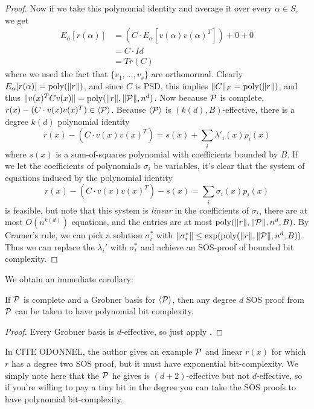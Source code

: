 \begin{proof}
Now if we take this polynomial identity and average it over every $\alpha \in S$, we get
\begin{align*}
E_\alpha[r(\alpha)] &= (C \cdot E_\alpha[v(\alpha)v(\alpha)^T]) + 0 + 0\\
&= C \cdot Id \\
&= Tr(C)
\end{align*}
where we used the fact that $\{v_1,\dots,v_s\}$ are orthonormal. Clearly $E_\alpha[r(\alpha)] = \operatorname{poly}(\|r\|)$, and since $C$ is PSD, this implies $\|C\|_F = \operatorname{poly}(\|r\|)$, and thus $\|v(x)^TCv(x)\| = \operatorname{poly}(\|r\|,\|\mathcal P\|,n^d)$. Now because $\mathcal P$ is complete, $r(x) - (C \cdot v(x)v(x)^T) \in \langle \mathcal P\rangle$. Because $\langle \mathcal P\rangle$ is $(k(d), B)$-effective, there is a degree $k(d)$ polynomial identity
\[r(x) - (C \cdot v(x)v(x)^T) = s(x) + \sum_i \lambda'_i(x)p_i(x)\]
where $s(x)$ is a sum-of-squares polynomial with coefficients bounded by $B$. If we let the coefficients of polynomials $\sigma_i$ be variables, it's clear that the system of equations induced by the polynomial identity 
\[r(x) - (C\cdot v(x)v(x)^T) - s(x) = \sum_i \sigma_i(x)p_i(x)\]
is feasible, but note that this system is \emph{linear} in the coefficients of $\sigma_i$, there are at most $O(n^{k(d)})$ equations, and the entries are at most $\operatorname{poly}(\|r\|,\|\mathcal P\|,n^d, B)$. By Cramer's rule, we can pick a solution $\sigma_i^*$ with $\|\sigma_i^*\| \leq \exp(\operatorname{poly}(\|r\|,\|\mathcal P\|,n^d, B))$. Thus we can replace the $\lambda_i'$ with $\sigma_i^*$ and achieve an SOS-proof of bounded bit complexity. 
\end{proof}
We obtain an immediate corollary:
\begin{corollary}\label{cor:grobner}
If $\mathcal P$ is complete and a Grobner basis for $\langle \mathcal P\rangle$, then any degree $d$ SOS proof from $\mathcal P$ can be taken to have polynomial bit complexity. 
\end{corollary}
\begin{proof}
Every Grobner basis is $d$-effective, so just apply .
\end{proof}
\begin{remark}
In CITE ODONNEL, the author gives an example $\mathcal P$ and linear $r(x)$ for which $r$ has a degree two SOS proof, but it must have exponential bit-complexity. We simply note here that the $\mathcal P$ he gives is $(d+2)$-effective but not $d$-effective, so if you're willing to pay a tiny bit in the degree you can take the SOS proofs to have polynomial bit-complexity.
\end{remark}
